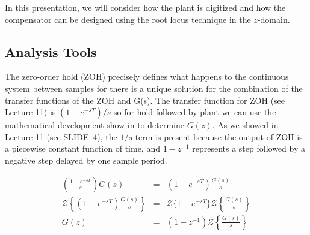 In this presentation, we will consider how the plant is digitized and how the
compensator can be designed using the root locus technique in the $z$-domain.

\subsection*{Analysis Tools}

\begin{slide}\label{slides:l12s11}
\end{slide}

\begin{slide}\label{slides:l12s12}
\end{slide}

The zero-order hold (ZOH) precisely defines what happens to the continuous system between samples for there is a unique solution for the combination of the transfer functions of the ZOH and G(s). The transfer function for ZOH  (see Lecture 11) is $(1-e^{-sT})/s$ so for hold followed by plant we can use the mathematical development show in  to determine $G(z)$. As we showed in Lecture 11 (see SLIDE~4), the $1/s$ term is present because the output of ZOH is a piecewise constant function of time, and $1-z^{-1}$ represents a step followed by a negative step delayed by one sample period.


\begin{slide}\label{slides:l12s13}

	\begin{eqnarray*}
		\left(\frac{1-e^{-sT}}{s}\right)G(s) & = & (1-e^{-sT})\frac{G(s)}{s} \\
		\mathcal{Z}\left\{(1-e^{-sT})\frac{G(s)}{s}\right\} & = & \mathcal{Z}\{1-e^{-sT}\}\mathcal{Z}\left\{\frac{G(s)}{s}\right\} \\
		G(z) & = & (1-z^{-1}) \mathcal{Z}\left\{\frac{G(s)}{s}\right\}
	\end{eqnarray*}
\end{slide}

